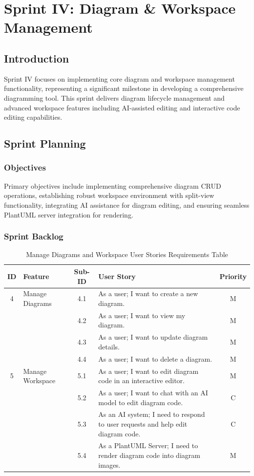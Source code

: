 \chapter[Sprint IV]{Sprint IV: Diagram \& Workspace Management}

\section{Introduction}
Sprint IV focuses on implementing core diagram and workspace management functionality, representing a significant milestone in developing a comprehensive diagramming tool. This sprint delivers diagram lifecycle management and advanced workspace features including AI-assisted editing and interactive code editing capabilities.

\section{Sprint Planning}

\subsection{Objectives}
Primary objectives include implementing comprehensive diagram CRUD operations, establishing robust workspace environment with split-view functionality, integrating AI assistance for diagram editing, and ensuring seamless PlantUML server integration for rendering.

\subsection{Sprint Backlog}

\begin{table}[h]
    \centering
    \begin{tabular}{|c|l|c|p{8cm}|c|}
    \hline
    \textbf{ID} & \textbf{Feature} & \textbf{Sub-ID} & \textbf{User Story} & \textbf{Priority} \\
    \hline
    4 & Manage Diagrams & 4.1 & As a user; I want to create a new diagram. & M \\
    \hline
      &  & 4.2 & As a user; I want to view my diagram. & M \\
    \hline
      &  & 4.3 & As a user; I want to update diagram details. & M \\
    \hline
      &  & 4.4 & As a user; I want to delete a diagram. & M \\
    \hline
    5 & Manage Workspace & 5.1 & As a user; I want to edit diagram code in an interactive editor. & M \\
    \hline
      &  & 5.2 & As a user; I want to chat with an AI model to edit diagram code. & C \\
    \hline
      &  & 5.3 & As an AI system; I need to respond to user requests and help edit diagram code. & C \\
    \hline
      &  & 5.4 & As a PlantUML Server; I need to render diagram code into diagram images. & M \\
    \hline
    \end{tabular}
    \caption{Manage Diagrams and Workspace User Stories Requirements Table}
    \label{tab:diagrams_workspace}
    \end{table}
